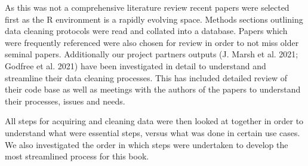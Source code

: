 \documentclass[
  letterpaper,
  DIV=11,
  numbers=noendperiod,
  oneside]{scrreprt}
\begin{document}
As this was not a comprehensive literature review recent papers were
selected first as the R environment is a rapidly evolving space. Methods
sections outlining data cleaning protocols were read and collated into a
database. Papers which were frequently referenced were also chosen for
review in order to not miss older seminal papers. Additionally our
project partners outputs (J. Marsh et al. 2021; Godfree et al. 2021)
have been investigated in detail to understand and streamline their data
cleaning processes. This has included detailed review of their code base
as well as meetings with the authors of the papers to understand their
processes, issues and needs.

All steps for acquiring and cleaning data were then looked at together
in order to understand what were essential steps, versus what was done
in certain use cases. We also investigated the order in which steps were
undertaken to develop the most streamlined process for this book.
\end{document}
